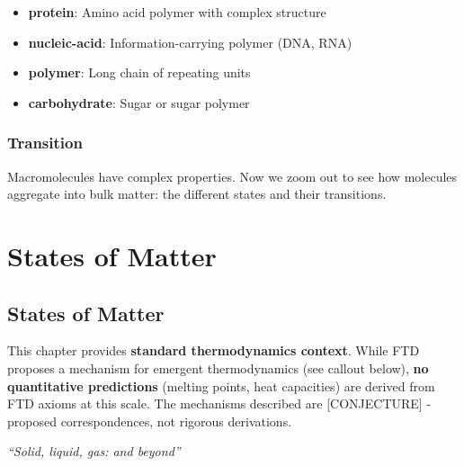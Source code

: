\documentclass[
  11pt,
  letterpaper,
  twoside,
  openright]{book}
\providecommand{\tightlist}{%
  \setlength{\itemsep}{0pt}\setlength{\parskip}{0pt}}
\begin{document}
\begin{itemize}
\tightlist
\item
  \textbf{protein}: Amino acid polymer with complex structure
\item
  \textbf{nucleic-acid}: Information-carrying polymer (DNA, RNA)
\item
  \textbf{polymer}: Long chain of repeating units
\item
  \textbf{carbohydrate}: Sugar or sugar polymer
\end{itemize}

\section{Transition}\label{transition-7}

Macromolecules have complex properties. Now we zoom out to see how
molecules aggregate into bulk matter: the different states and their
transitions.

\part{States of Matter}

\chapter{States of Matter}\label{sec-states-matter}

\begin{tcolorbox}[enhanced jigsaw, leftrule=.75mm, title=\textcolor{quarto-callout-warning-color}{\faExclamationTriangle}\hspace{0.5em}{Pedagogical Context {[}NOT DERIVED FROM FTD{]}}, bottomrule=.15mm, opacityback=0, coltitle=black, arc=.35mm, colframe=quarto-callout-warning-color-frame, colbacktitle=quarto-callout-warning-color!10!white, colback=white, titlerule=0mm, breakable, bottomtitle=1mm, toptitle=1mm, rightrule=.15mm, toprule=.15mm, left=2mm, opacitybacktitle=0.6]

This chapter provides \textbf{standard thermodynamics context}. While
FTD proposes a mechanism for emergent thermodynamics (see callout
below), \textbf{no quantitative predictions} (melting points, heat
capacities) are derived from FTD axioms at this scale. The mechanisms
described are {[}CONJECTURE{]} - proposed correspondences, not rigorous
derivations.

\end{tcolorbox}

\emph{``Solid, liquid, gas: and beyond''}
\end{document}
